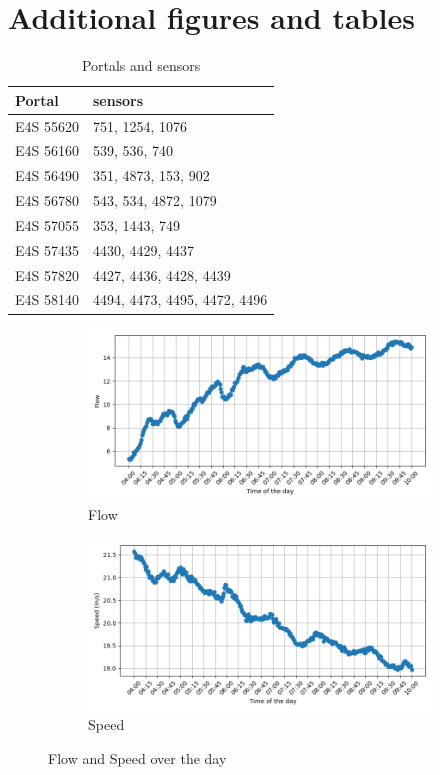 	\section{ Additional figures and tables}
		\begin{table}[H]
		\centering
		\caption{Portals and sensors}
		\label{tab:portalsandsensors}
		\begin{tabular}{|l|l|}
			\hline
			Portal & sensors \\
			\hline
			E4S 55620 & 751, 1254, 1076 \\
			E4S 56160 & 539, 536, 740 \\
			E4S 56490 & 351, 4873, 153, 902 \\
			E4S 56780 & 543, 534, 4872, 1079 \\
			E4S 57055 & 353, 1443, 749 \\
			E4S 57435 & 4430, 4429, 4437 \\
			E4S 57820 & 4427, 4436, 4428, 4439 \\
			E4S 58140 & 4494, 4473, 4495, 4472, 4496 \\
			\hline
		\end{tabular}
	\end{table}
	
	
		\begin{figure}[H]
		\centering
		\begin{subfigure}{0.7 \linewidth}
			\includegraphics[width=\textwidth]{../Plots/Flow/avg_flow_day}
			\caption{Flow}
		\end{subfigure}
		\begin{subfigure}{0.7 \linewidth}
			\includegraphics[width=\textwidth]{../Plots/Speed/avg_speed_day}
			\caption{Speed}
		\end{subfigure}
		\caption{Flow and Speed over the day}
		\label{fig:speed_and_flow_overday}
	\end{figure}
	
